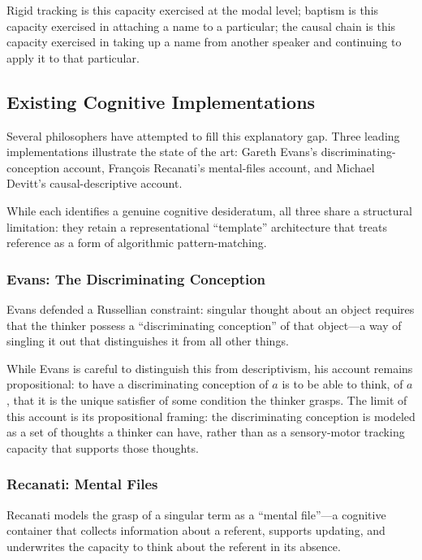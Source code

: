 \documentclass[10pt]{article}
\begin{document}
Rigid tracking is this capacity exercised at the modal level; baptism is this capacity exercised in attaching a name to a particular; the causal chain is this capacity exercised in taking up a name from another speaker and continuing to apply it to that particular.

\subsection{Existing Cognitive Implementations}\label{existing-cognitive-implementations}

Several philosophers have attempted to fill this explanatory gap. Three leading implementations illustrate the state of the art: Gareth Evans's discriminating-conception account, François Recanati's mental-files account, and Michael Devitt's causal-descriptive account.

While each identifies a genuine cognitive desideratum, all three share a structural limitation: they retain a representational ``template'' architecture that treats reference as a form of algorithmic pattern-matching.

\subsubsection{Evans: The Discriminating Conception}\label{evans-the-discriminating-conception}

Evans defended a Russellian constraint: singular thought about an object requires that the thinker possess a ``discriminating conception'' of that object---a way of singling it out that distinguishes it from all other things.

While Evans is careful to distinguish this from descriptivism, his account remains propositional: to have a discriminating conception of \(a\) is to be able to think, of \(a\), that it is the unique satisfier of some condition the thinker grasps. The limit of this account is its propositional framing: the discriminating conception is modeled as a set of thoughts a thinker can have, rather than as a sensory-motor tracking capacity that supports those thoughts.

\subsubsection{Recanati: Mental Files}\label{recanati-mental-files}

Recanati models the grasp of a singular term as a ``mental file''---a cognitive container that collects information about a referent, supports updating, and underwrites the capacity to think about the referent in its absence.
\end{document}
